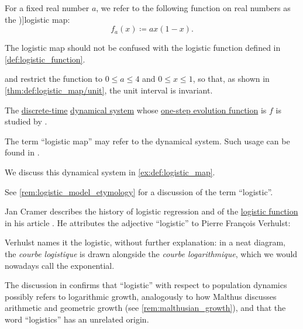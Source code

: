 \begin{definition}\label{def:logistic_map}\mimprovised
  For a fixed real number \( a \), we refer to the following function on real numbers as the \term[en=logistic map (\cite[22]{Müller2022HandbookOfDynamicsAndProbability})]{logistic map}:
  \begin{equation}\label{eq:def:logistic_map}
    f_a(x) \coloneqq a x (1 - x).
  \end{equation}
\end{definition}
\begin{comments}
  \item The logistic map should not be confused with the logistic function defined in \cref{def:logistic_function}.

  \item \Textcite[22]{Müller2022HandbookOfDynamicsAndProbability} and \textcite[43]{Elaydi2007DiscreteChaos} restrict the function to \( 0 \leq a \leq 4 \) and \( 0 \leq x \leq 1 \), so that, as shown in \cref{thm:def:logistic_map/unit}, the unit interval is invariant.

  The \hyperref[def:discrete_dynamical_system]{discrete-time} \hyperref[def:dynamical_system]{dynamical system} whose \hyperref[def:one_step_evolution_function]{one-step evolution function} is \( f \) is studied by \textcite{May1976DiscreteLogisticMap}.

  The term \enquote{logistic map} may refer to the dynamical system. Such usage can be found in \cite[353]{Strogatz1994NonlinearDynamics}.

  We discuss this dynamical system in \cref{ex:def:logistic_map}.

  \item See \cref{rem:logistic_model_etymology} for a discussion of the term \enquote{logistic}.
\end{comments}

\begin{remark}\label{rem:logistic_model_etymology}
  Jan Cramer describes the history of logistic regression and of the \hyperref[def:logistic_function]{logistic function} in his article \cite{Cramer2003OriginsOfLogisticRegression}. He attributes the adjective \enquote{logistic} to Pierre Fran\c{c}ois Verhulst:
  \begin{displayquote}
    Verhulst names it the logistic, without further explanation: in a neat diagram, the \textit{courbe logistique} is drawn alongside the \textit{courbe logarithmique}, which we would nowadays call the exponential.
  \end{displayquote}

  The discussion in \cite{HSMSE:logistic_growth_etymology} confirms that \enquote{logistic} with respect to population dynamics possibly refers to logarithmic growth, analogously to how Malthus discusses arithmetic and geometric growth (see \cref{rem:malthusian_growth}), and that the word \enquote{logistics} has an unrelated origin.
\end{remark}

